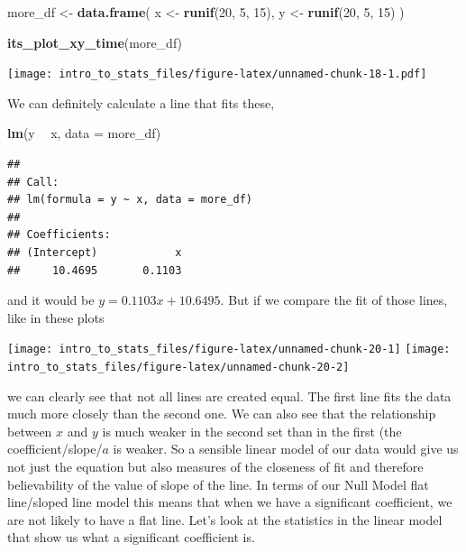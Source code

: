 \documentclass[
]{book}
\newenvironment{Shaded}{\begin{snugshade}}{\end{snugshade}}
\newcommand{\DataTypeTok}[1]{\textcolor[rgb]{0.13,0.29,0.53}{#1}}
\newcommand{\DecValTok}[1]{\textcolor[rgb]{0.00,0.00,0.81}{#1}}
\newcommand{\KeywordTok}[1]{\textcolor[rgb]{0.13,0.29,0.53}{\textbf{#1}}}
\newcommand{\NormalTok}[1]{#1}
\newcommand{\OperatorTok}[1]{\textcolor[rgb]{0.81,0.36,0.00}{\textbf{#1}}}
\newcommand{\StringTok}[1]{\textcolor[rgb]{0.31,0.60,0.02}{#1}}
\begin{document}
\begin{Shaded}
\begin{Highlighting}[]
\NormalTok{more_df <-}\StringTok{ }\KeywordTok{data.frame}\NormalTok{(}
\NormalTok{  x <-}\StringTok{ }\KeywordTok{runif}\NormalTok{(}\DecValTok{20}\NormalTok{, }\DecValTok{5}\NormalTok{, }\DecValTok{15}\NormalTok{),}
\NormalTok{  y <-}\StringTok{ }\KeywordTok{runif}\NormalTok{(}\DecValTok{20}\NormalTok{, }\DecValTok{5}\NormalTok{, }\DecValTok{15}\NormalTok{)}
\NormalTok{)}

\KeywordTok{its_plot_xy_time}\NormalTok{(more_df)}
\end{Highlighting}
\end{Shaded}

\texttt{[image: intro\_to\_stats\_files/figure-latex/unnamed-chunk-18-1.pdf]}

We can definitely calculate a line that fits these,

\begin{Shaded}
\begin{Highlighting}[]
\KeywordTok{lm}\NormalTok{(y }\OperatorTok{~}\StringTok{ }\NormalTok{x, }\DataTypeTok{data =}\NormalTok{ more_df)}
\end{Highlighting}
\end{Shaded}

\begin{verbatim}
## 
## Call:
## lm(formula = y ~ x, data = more_df)
## 
## Coefficients:
## (Intercept)            x  
##     10.4695       0.1103
\end{verbatim}

and it would be \(y = 0.1103x + 10.6495\). But if we compare the fit of those lines, like in these plots

\texttt{[image: intro\_to\_stats\_files/figure-latex/unnamed-chunk-20-1]} \texttt{[image: intro\_to\_stats\_files/figure-latex/unnamed-chunk-20-2]}

we can clearly see that not all lines are created equal. The first line fits the data much more closely than the second one. We can also see that the relationship between \(x\) and \(y\) is much weaker in the second set than in the first (the coefficient/slope/\(a\) is weaker. So a sensible linear model of our data would give us not just the equation but also measures of the closeness of fit and therefore believability of the value of slope of the line. In terms of our Null Model flat line/sloped line model this means that when we have a significant coefficient, we are not likely to have a flat line. Let's look at the statistics in the linear model that show us what a significant coefficient is.
\end{document}
